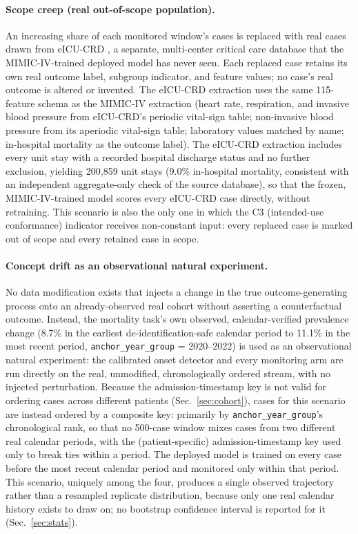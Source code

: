 \documentclass[preprintsapa,article,submit,oneauthor]{Definitions/mdpi}
\begin{document}
\paragraph{Scope creep (real out-of-scope population).}\label{sec:scopecreep} An increasing share of each monitored window's cases is replaced with real cases drawn from eICU-CRD \citep{pollard2018}, a separate, multi-center critical care database that the MIMIC-IV-trained deployed model has never seen. Each replaced case retains its own real outcome label, subgroup indicator, and feature values; no case's real outcome is altered or invented. The eICU-CRD extraction uses the same 115-feature schema as the MIMIC-IV extraction (heart rate, respiration, and invasive blood pressure from eICU-CRD's periodic vital-sign table; non-invasive blood pressure from its aperiodic vital-sign table; laboratory values matched by name; in-hospital mortality as the outcome label). The eICU-CRD extraction includes every unit stay with a recorded hospital discharge status and no further exclusion, yielding 200{,}859 unit stays (9.0\% in-hospital mortality, consistent with an independent aggregate-only check of the source database), so that the frozen, MIMIC-IV-trained model scores every eICU-CRD case directly, without retraining. This scenario is also the only one in which the C3 (intended-use conformance) indicator receives non-constant input: every replaced case is marked out of scope and every retained case in scope.

\paragraph{Concept drift as an observational natural experiment.}\label{sec:sc08} No data modification exists that injects a change in the true outcome-generating process onto an already-observed real cohort without asserting a counterfactual outcome. Instead, the mortality task's own observed, calendar-verified prevalence change (8.7\% in the earliest de-identification-safe calendar period to 11.1\% in the most recent period, \texttt{anchor\_year\_group} = 2020--2022) is used as an observational natural experiment: the calibrated onset detector and every monitoring arm are run directly on the real, unmodified, chronologically ordered stream, with no injected perturbation. Because the admission-timestamp key is not valid for ordering cases across different patients (Sec.~\ref{sec:cohort}), cases for this scenario are instead ordered by a composite key: primarily by \texttt{anchor\_year\_group}'s chronological rank, so that no 500-case window mixes cases from two different real calendar periods, with the (patient-specific) admission-timestamp key used only to break ties within a period. The deployed model is trained on every case before the most recent calendar period and monitored only within that period. This scenario, uniquely among the four, produces a single observed trajectory rather than a resampled replicate distribution, because only one real calendar history exists to draw on; no bootstrap confidence interval is reported for it (Sec.~\ref{sec:stats}).
\end{document}
